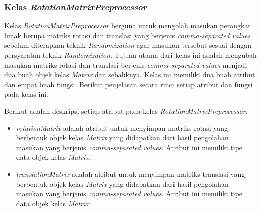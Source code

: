 \subsubsection{Kelas \textit{RotationMatrixPreprocessor}}
\label{subsubsec:kelas-rotationpre}

Kelas \textit{RotationMatrixPreprocessor} berguna untuk mengolah masukan perangkat lunak berupa matriks rotasi dan translasi yang berjenis \textit{comma-separated values} sebelum diterapkan teknik \textit{Randomization} agar masukan tersebut sesuai dengan persyaratan teknik \textit{Randomization}. Tujuan utama dari kelas ini adalah mengubah masukan matriks rotasi dan translasi berjenis \textit{comma-separated values} menjadi dua buah objek kelas \textit{Matrix} dan sebaliknya. Kelas ini memiliki dua buah atribut dan empat buah fungsi. Berikut penjelasan secara rinci setiap atribut dan fungsi pada kelas ini.

Berikut adalah deskripsi setiap atribut pada kelas \textit{RotationMatrixPreprocessor}.
\begin{itemize}
	\item \textit{rotationMatrix} adalah atribut untuk menyimpan matriks rotasi yang berbentuk objek kelas \textit{Matrix} yang didapatkan dari hasil pengolahan masukan yang berjenis \textit{comma-separated values}. Atribut ini memiliki tipe data objek kelas \textit{Matrix}.
	\item \textit{translationMatrix} adalah atribut untuk menyimpan matriks translasi yang berbentuk objek kelas \textit{Matrix} yang didapatkan dari hasil pengolahan masukan yang berjenis \textit{comma-separated values}. Atribut ini memiliki tipe data objek kelas \textit{Matrix}.
\end{itemize}

